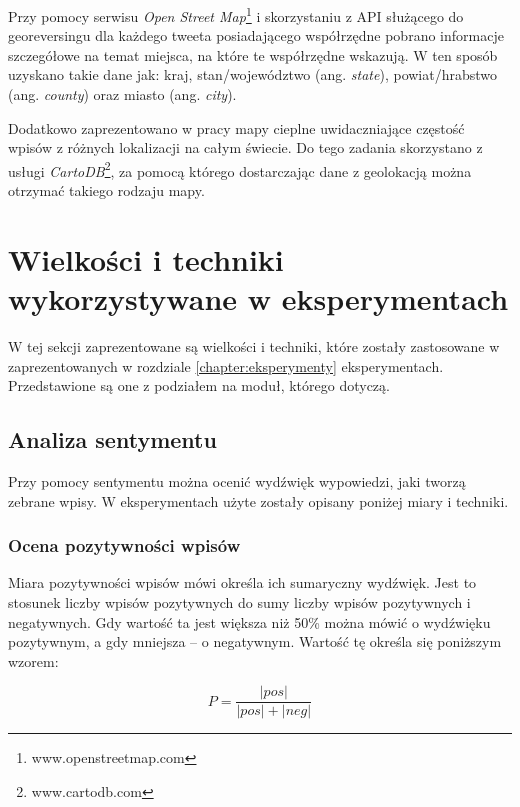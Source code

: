 Przy pomocy serwisu \textit{Open Street Map}\footnote{www.openstreetmap.com} i
skorzystaniu z API służącego do georeversingu dla każdego tweeta posiadającego
współrzędne pobrano informacje szczegółowe na temat miejsca, na które te
współrzędne wskazują. W ten sposób uzyskano takie dane jak: kraj,
stan/województwo (ang. \textit{state}), powiat/hrabstwo (ang. \textit{county})
oraz miasto (ang. \textit{city}).

Dodatkowo zaprezentowano w pracy mapy cieplne uwidaczniające częstość wpisów z
różnych lokalizacji na całym świecie. Do tego zadania skorzystano z usługi
\textit{CartoDB}\footnote{www.cartodb.com}, za pomocą którego dostarczając dane
z geolokacją można otrzymać takiego rodzaju mapy.




\section{Wielkości i techniki wykorzystywane w eksperymentach}
\label{section:wielkosciwykorzystywane}
W tej sekcji zaprezentowane są wielkości i techniki, które zostały zastosowane w
zaprezentowanych w rozdziale \ref{chapter:eksperymenty} eksperymentach.
Przedstawione są one z podziałem na moduł, którego dotyczą.

\subsection{Analiza sentymentu}
Przy pomocy sentymentu można ocenić wydźwięk wypowiedzi, jaki tworzą zebrane
wpisy. W eksperymentach użyte zostały opisany poniżej miary i techniki.

\subsubsection{Ocena pozytywności wpisów}
\label{subsection:ocenapozytywnosci}
Miara pozytywności wpisów mówi określa ich sumaryczny wydźwięk. Jest to stosunek
liczby wpisów pozytywnych do sumy liczby wpisów pozytywnych i negatywnych. Gdy
wartość ta jest większa niż 50\% można mówić o wydźwięku pozytywnym, a gdy
mniejsza -- o negatywnym. Wartość tę określa się poniższym wzorem: 

\begin{equation}
\label{equation:pozytywnosc}
P = \frac{|pos|}{|pos| + |neg|}
\end{equation}

